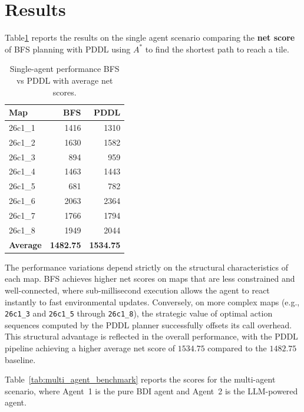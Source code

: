 \section{Results}\label{sec:results}

Table\ref{tab:single_agent_benchmark} reports the results on the single agent scenario comparing the \textbf{net score} of BFS planning with PDDL using $A^*$ to find the shortest path to reach a tile.

\begin{table}[h]
\centering
\setlength{\tabcolsep}{12pt} %
\caption{Single-agent performance BFS vs PDDL with average net scores.}
\label{tab:single_agent_benchmark}
\begin{tabular}{lrr}
\hline
\textbf{Map} & \textbf{BFS} & \textbf{PDDL} \\ \hline
26c1\_1 & 1416 & 1310 \\
26c1\_2 & 1630 & 1582 \\
26c1\_3 & 894  & 959  \\
26c1\_4 & 1463 & 1443 \\
26c1\_5 & 681  & 782  \\
26c1\_6 & 2063 & 2364 \\
26c1\_7 & 1766 & 1794 \\
26c1\_8 & 1949 & 2044 \\ \hline
\textbf{Average} & \textbf{1482.75} & \textbf{1534.75} \\ \hline
\end{tabular}
\end{table}

The performance variations depend strictly on the structural characteristics of each map. BFS achieves higher net scores on maps that are less constrained and well-connected, where sub-millisecond execution allows the agent to react instantly to fast environmental updates. Conversely, on more complex maps (e.g., \texttt{26c1\_3} and \texttt{26c1\_5} through \texttt{26c1\_8}), the strategic value of optimal action sequences computed by the PDDL planner successfully offsets its call overhead. This structural advantage is reflected in the overall performance, with the PDDL pipeline achieving a higher average net score of $1534.75$ compared to the $1482.75$ baseline.



Table~\ref{tab:multi_agent_benchmark} reports the scores for the multi-agent scenario, where Agent~1 is the pure BDI agent and Agent~2 is the LLM-powered agent.

